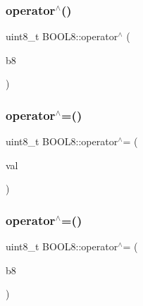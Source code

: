 \hypertarget{struct_b_o_o_l8_a5ccf74d3b597ef781245587f1cd80371}{}\label{struct_b_o_o_l8_a5ccf74d3b597ef781245587f1cd80371} 
\subsubsection{\texorpdfstring{operator$^\wedge$()}{operator^()}\hspace{0.1cm}{\footnotesize\ttfamily [2/2]}}
{\footnotesize\ttfamily uint8\+\_\+t B\+O\+O\+L8\+::operator$^\wedge$ (\begin{DoxyParamCaption}\item[{const \hyperlink{struct_b_o_o_l8}{B\+O\+O\+L8}}]{b8 }\end{DoxyParamCaption})\hspace{0.3cm}{\ttfamily [inline]}}

\hypertarget{struct_b_o_o_l8_ad39e2e7a7089ead2fa8607658548f191}{}\label{struct_b_o_o_l8_ad39e2e7a7089ead2fa8607658548f191} 
\subsubsection{\texorpdfstring{operator$^\wedge$=()}{operator^=()}\hspace{0.1cm}{\footnotesize\ttfamily [1/2]}}
{\footnotesize\ttfamily uint8\+\_\+t B\+O\+O\+L8\+::operator$^\wedge$= (\begin{DoxyParamCaption}\item[{const uint8\+\_\+t}]{val }\end{DoxyParamCaption})\hspace{0.3cm}{\ttfamily [inline]}}

\hypertarget{struct_b_o_o_l8_a673c35786949a1f5c208caff8d3eefb0}{}\label{struct_b_o_o_l8_a673c35786949a1f5c208caff8d3eefb0} 
\subsubsection{\texorpdfstring{operator$^\wedge$=()}{operator^=()}\hspace{0.1cm}{\footnotesize\ttfamily [2/2]}}
{\footnotesize\ttfamily uint8\+\_\+t B\+O\+O\+L8\+::operator$^\wedge$= (\begin{DoxyParamCaption}\item[{const \hyperlink{struct_b_o_o_l8}{B\+O\+O\+L8}}]{b8 }\end{DoxyParamCaption})\hspace{0.3cm}{\ttfamily [inline]}}

